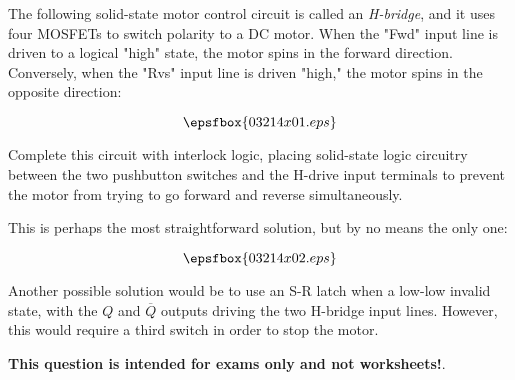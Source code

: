 

The following solid-state motor control circuit is called an {\it H-bridge}, and it uses four MOSFETs to switch polarity to a DC motor.  When the "Fwd" input line is driven to a logical "high" state, the motor spins in the forward direction.  Conversely, when the "Rvs" input line is driven "high," the motor spins in the opposite direction:

$$\epsfbox{03214x01.eps}$$

Complete this circuit with interlock logic, placing solid-state logic circuitry between the two pushbutton switches and the H-drive input terminals to prevent the motor from trying to go forward and reverse simultaneously.







This is perhaps the most straightforward solution, but by no means the only one:

$$\epsfbox{03214x02.eps}$$

Another possible solution would be to use an S-R latch when a low-low invalid state, with the $Q$ and $\overline{Q}$ outputs driving the two H-bridge input lines.  However, this would require a third switch in order to stop the motor.







{\bf This question is intended for exams only and not worksheets!}.




